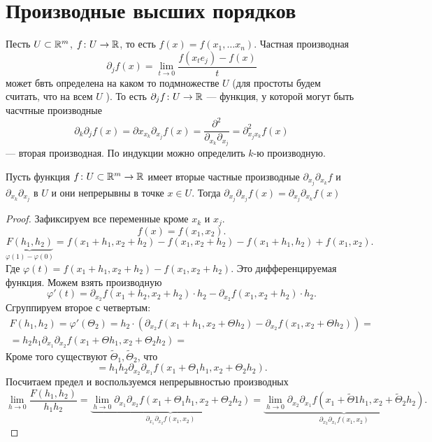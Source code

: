 % 
% 
%
\section{Производные высших порядков}
\begin{defn}
    Песть $ U \subset \mathbb{R}^{m} $, $ f\colon U \to  \mathbb{R}$, то есть $ f(x) = f(x_1, \ldots x_{n})$. Частная производная
    \[
	\partial _jf(x)  = \lim_{t \to  0} \frac{f(x_t e_j) - f(x)}{t}
    \] 
    может бвть определена на каком то подмножестве $ U$ (для простоты будем считать, что на всем  $ U$ ). То есть $ \partial _j f \colon U \to \mathbb{R}$ --- функция, у которой могут быть часчтные производные
    \[
	\partial _k \partial _j f(x) = \partial x_{x_k} \partial _{x_j}f(x) = \frac{\partial ^2}{\partial _{x_k} \partial _{x_j}} = \partial ^2_{x_j x_k} f(x)
    \] --- вторая производная. 
	По индукции можно определить  $ k$-ю производную.
\end{defn}
\begin{thm}
Пусть функция $ f\colon U \subset \mathbb{R}^{m} \to  \mathbb{R}$ имеет вторые частные производные  $ \partial _{x_j} \partial _{x_k} f$ и $ \partial _{x_k} \partial _{x_j}$ в $ U$ и они непрерывны в точке   $ x \in U$. Тогда $ \partial _{x_j} \partial _{   x_j} f(x) = \partial _{x_j} \partial _{  x_{k}}f(x)$
\end{thm}
\begin{proof}
    Зафиксируем все переменные кроме $ x_k$ и $ x_j$.
    \[
	f(x) = f(x_1, x_2)
    .\] 
    \[
	\underbrace{F(h_1, h_2)}_{ \varphi (1) - \varphi (0)} = f(x_1+h_1, x_2+h_2) - f(x_1, x_2+h_2) - f(x_1 + h_1, h_2) + f(x_1, x_2)
    .\] 
    Где $ \varphi (t) = f(x_1+h_1, x_2+h_2) - f(x_1, x_2+h_2)$.
    Это дифференцируемая функция. Можем взять производную
    \[
	\varphi '(t) = \partial _{x_2}f(x_1 + h_2, x_2+h_2) \cdot h_2 - \partial _{x_2}f(x_1, x_2+h_2)\cdot h_2 
    .\] 
    Сгруппируем второе с четвертым:
    $$
    \begin{aligned}
	F(h_1, h_2) = \varphi '( \Theta_2) = h_2  \cdot \left( \partial _{x_2}f(x_1 + h_1, x_2+\Theta h_2) - \partial _{x_2}f(x_1, x_2+ \Theta h_2) \right)  = \\
	= h_2 h_1 \partial _{x_1} \partial _{x_2} f(x_1+ \Theta h_1, x_2+ \Theta_2 h_2) = 
    \end{aligned}
    $$
    Кроме того существуют $ \tilde \Theta_1, \tilde \Theta_2$, что
    \[
	= h_1 h_2  \partial _{x_2} \partial _{x_1} f(x_1 + \Theta_1 h_1, x_2+ \Theta_2 h_2)
    .\] 
    Посчитаем предел  и воспользуемся непрерывностью производных
    \[
	\lim_{h \to  0} \frac{F(h_1, h_2)}{h_1h_2}  = \underbrace{\lim_{h \to  0} \partial _{x_1} \partial _{   x_2 }f(x_1 + \Theta_1 h_1, x_2 + \Theta_2 h_2)}_{\partial _{x_1} \partial _{x_2} f(x_1, x_2)} = \underbrace{\lim_{h \to  0} \partial _{x_2} \partial _{x_1} f(x_1 + \tilde \Theta 1 h_1, x_2 + \tilde \Theta_2 h_2) }_{\partial _{x_2} \partial _{x_1} f(x_1, x_2)}
    .\] 
\end{proof}
